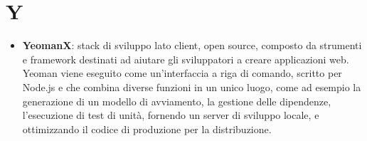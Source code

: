 \newpage
\section{Y}

\begin{itemize}
	\item \textbf{YeomanX}: stack di sviluppo lato client, open source, composto da strumenti e framework destinati ad aiutare gli sviluppatori a creare applicazioni web. Yeoman viene eseguito come un'interfaccia a riga di comando, scritto per Node.js e che combina diverse funzioni in un unico luogo, come ad esempio la generazione di un modello di avviamento, la gestione delle dipendenze, l'esecuzione di test di unità, fornendo un server di sviluppo locale, e ottimizzando il codice di produzione per la distribuzione.
\end{itemize}

